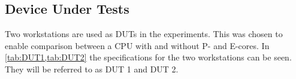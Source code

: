 \subsection{Device Under Tests}
Two workstations are used as DUTs in the experiments. This was chosen to enable comparison between a CPU with and without P- and E-cores. In \cref {tab:DUT1,tab:DUT2} the specifications for the two workstations can be seen. They will be referred to as DUT 1 and DUT 2. 

